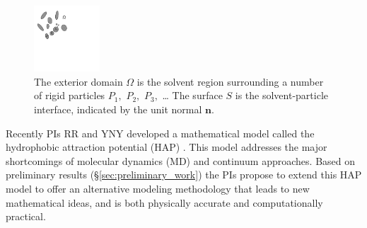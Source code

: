 \begin{figure}
\centerline{\includegraphics[width=0.22\textwidth]{figures/BG_fig1.pdf}}
\caption{The exterior domain $\Omega$ is the solvent region surrounding a
number of rigid particles $P_1,$ $P_2,$ $P_3,$ \dots 
The surface $S$ is the solvent-particle interface, indicated by the unit
normal $\mathbf{n}.$ }\label{fig:domain}
\end{figure}
Recently PIs RR and YNY developed a mathematical model called the 
hydrophobic attraction potential (HAP) \cite{Fu2018_SIAM}.
This model addresses the major shortcomings of molecular dynamics (MD) and continuum approaches. Based on preliminary results (\S\ref{sec:preliminary_work})
the PIs propose to extend this HAP model to offer
 an alternative modeling methodology that leads to new mathematical ideas,
and is both physically accurate and computationally practical.
%
%
%
%
